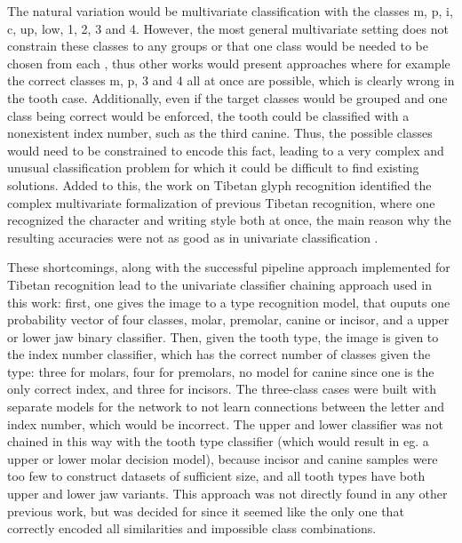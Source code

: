 \documentclass{article}
\begin{document}
The natural variation would be multivariate classification with the classes m, p, i, c, up, low, 1, 2, 3 and 4. However, 
the most general multivariate setting does not constrain these classes to any groups or that one class would be needed to be chosen from 
each \cite{multilabel_classification}, thus other works would present approaches where for example the correct classes m, p, 3 and 4 all at 
once are possible, which is clearly wrong in the tooth case. Additionally, even if the target classes would be grouped and one class
being correct would be enforced,
the tooth could be classified with a nonexistent index number, such as the third canine. Thus, the possible classes would need to 
be constrained to encode this fact, leading to a very complex and unusual classification problem for which it could be difficult to 
find existing solutions. Added to this, the work on Tibetan glyph recognition identified the complex multivariate formalization of 
previous Tibetan recognition, where one recognized the character and writing style both at once, the main reason why the resulting 
accuracies were not as good as in univariate classification \cite{4zhaoTibetan}.

These shortcomings, along with the successful pipeline approach implemented for Tibetan recognition \cite{4zhaoTibetan}
lead to the univariate classifier chaining approach used in this work: first, one gives the image to a type recognition 
model, that ouputs one probability vector of four classes, molar, premolar, canine or incisor, and a upper or lower jaw 
binary classifier. Then, given the tooth type, the image is given to the index number classifier, which has the correct number 
of classes given the type: three for molars, four for premolars, no model for canine since one is the only correct index, and 
three for incisors. The three-class cases were built with separate models for the network to not 
learn connections between the letter and index number, which would be incorrect. The upper and lower classifier was not chained in this way with the tooth type classifier (which would result in eg. a upper or lower 
molar decision model), because incisor and canine samples were too few to construct datasets of sufficient size, and all tooth types have 
both upper and lower jaw variants. This approach was not directly found in any other previous work, but was decided 
for since it seemed like the only one that correctly encoded all similarities and impossible class combinations. 
\end{document}
